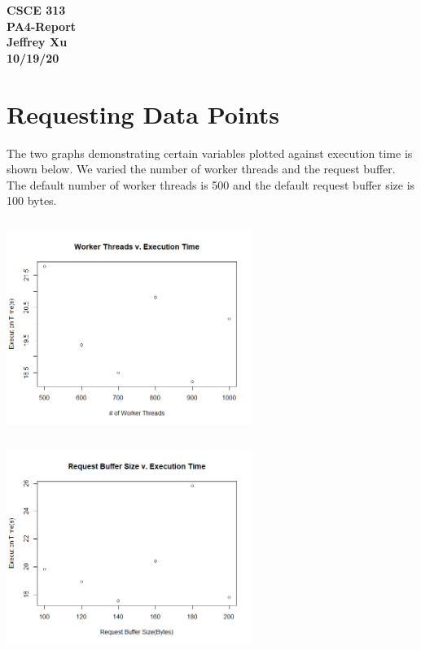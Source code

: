 \documentclass[12pt]{article}
\begin{document}
\begin{center}

{\bf
CSCE 313\\
PA4-Report\\
Jeffrey Xu\\
10/19/20\\
}

\end{center}

\section{Requesting Data Points}

The two graphs demonstrating certain variables plotted against execution time is shown below. We varied the number of worker threads and the request buffer. The default number of worker threads is 500 and the default request buffer size is 100 bytes. 

\begin{center}
\includegraphics[width=8cm, height=7cm]{PA4_WT_P}
\includegraphics[width=8cm, height=7cm]{PA4_BT-P}
\end{center}
\end{document}

